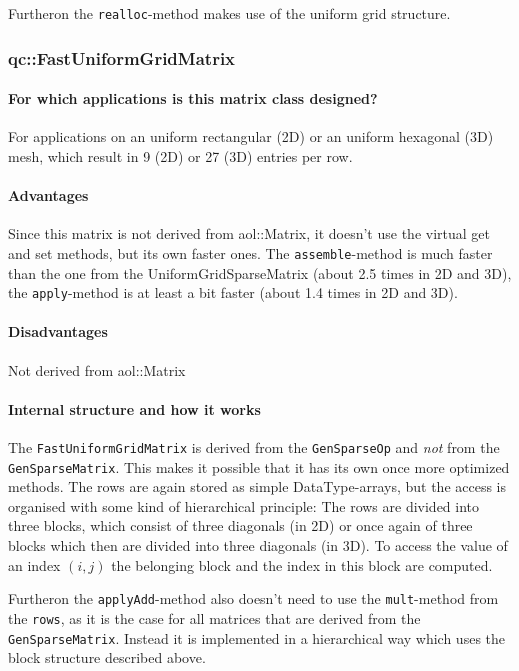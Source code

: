 Furtheron the \texttt{realloc}-method makes use of the uniform grid
structure.


\subsubsection{qc::FastUniformGridMatrix}
\paragraph{For which applications is this matrix class designed?}
For applications on an uniform rectangular (2D) or an uniform
hexagonal (3D) mesh, which result in 9 (2D) or 27 (3D) entries per
row.

\paragraph{Advantages}
Since this matrix is not derived from aol::Matrix, it doesn't use
the virtual get and set methods, but its own faster ones.
The \texttt{assemble}-method is much faster than the one from the
UniformGridSparseMatrix (about 2.5 times in 2D and 3D), the
\texttt{apply}-method is at least a bit faster (about 1.4 times in 2D
and 3D).

\paragraph{Disadvantages}
Not derived from aol::Matrix

\paragraph{Internal structure and how it works}
The \texttt{FastUniformGridMatrix} is derived from the
\texttt{GenSparseOp} and {\it not} from the \texttt{GenSparseMatrix}.
This makes it possible that it has its own once more optimized
methods.  The rows are again stored as simple DataType-arrays, but the
access is organised with some kind of hierarchical principle: The rows
are divided into three blocks, which consist of three diagonals (in
2D) or once again of three blocks which then are divided into three
diagonals (in 3D). To access the value of an index $(i,j)$ the
belonging block and the index in this block are computed.

Furtheron the \texttt{applyAdd}-method also doesn't need to use the
\texttt{mult}-method from the \texttt{rows}, as it is the case for all
matrices that are derived from the \texttt{GenSparseMatrix}. Instead
it is implemented in a hierarchical way which uses the block structure
described above.

